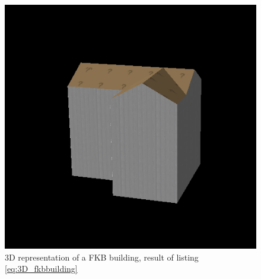 \begin{figure}[H]
    \centering
    \includegraphics[scale=0.5]{figures/FixedByMe/3DFKBbuilding.png}
    \caption{3D representation of a FKB building, result of listing \ref{eq:3D_fkbbuilding}}
    \label{fig:3DFKBbuild}
\end{figure}





